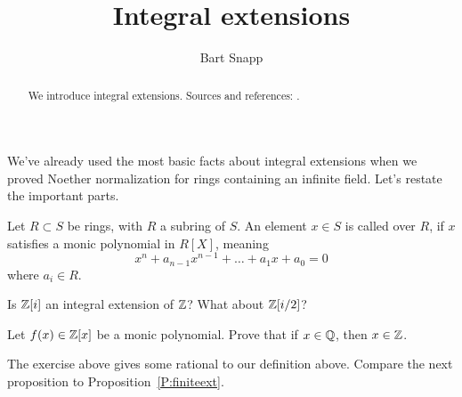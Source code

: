 \documentclass{ximera}
\author{Bart Snapp}
\title{Integral extensions}
\begin{document}
\begin{abstract}
  We introduce integral extensions. Sources and references:
  \cite{AM1969,iK1974}.
\end{abstract}
\maketitle


We've already used the most basic facts about integral extensions when
we proved Noether normalization for rings containing an infinite
field. Let's restate the important parts.
\begin{definition}
  Let $R\subset S$ be rings, with $R$ a subring of $S$. An element
  $x\in S$ is called  over $R$, if $x$ satisfies a monic
  polynomial in $R[X]$, meaning
  \[
  x^n + a_{n-1} x^{n-1} + \dots + a_1 x + a_0  = 0
  \]
  where $a_i\in R$.
\end{definition}


\begin{exercise}
  Is $\mathbb Z[i]$ an integral extension of $\mathbb Z$? What about $\mathbb Z[i/2]$?
\end{exercise}


\begin{exercise}
  Let $f(x)\in\mathbb Z[x]$ be a monic polynomial. Prove that if $x\in\mathbb Q$,
  then $x\in\mathbb Z$.
\end{exercise}




The exercise above gives some rational to our definition
above. Compare the next proposition to Proposition~\ref{P:finiteext}.
\end{document}
